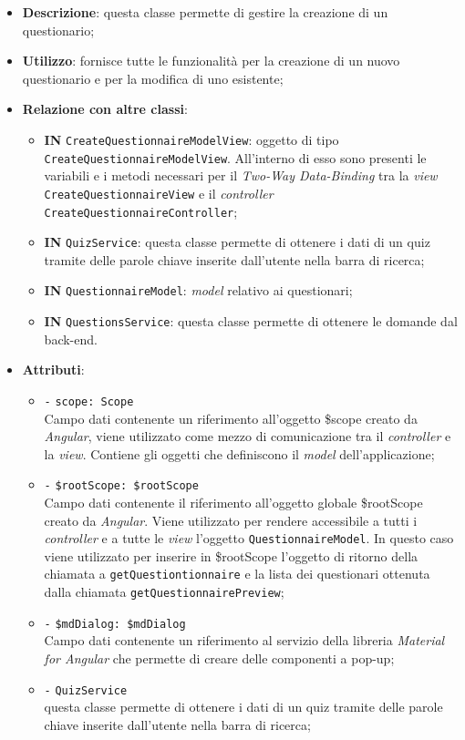 \begin{itemize}
	\item \textbf{Descrizione}: questa classe permette di gestire la creazione di un questionario;
	\item \textbf{Utilizzo}: fornisce tutte le funzionalità per la creazione di un nuovo questionario e per la modifica di uno esistente;
	\item \textbf{Relazione con altre classi}:
	\begin{itemize}
		\item \textbf{IN} \texttt{CreateQuestionnaireModelView}: oggetto di tipo \texttt{CreateQuestionnaireModelView}. All'interno di esso sono presenti le variabili e i metodi necessari per il \textit{Two-Way Data-Binding} tra la \textit{view} \texttt{CreateQuestionnaireView} e il \textit{controller} \\ \texttt{CreateQuestionnaireController}; 
		\item \textbf{IN} \texttt{QuizService}: questa classe permette di ottenere i dati di un quiz tramite delle parole chiave inserite dall'utente nella barra di ricerca;
		\item \textbf{IN} \texttt{QuestionnaireModel}: \textit{model} relativo ai questionari;
		\item \textbf{IN} \texttt{QuestionsService}: questa classe permette di ottenere le domande dal back-end.
	\end{itemize}
	\item \textbf{Attributi}:
	\begin{itemize}
		\item \texttt{-} \texttt{scope: Scope} \\
		Campo dati contenente un riferimento all'oggetto \$scope creato da \textit{Angular}, viene utilizzato come mezzo di comunicazione tra il \textit{controller} e la \textit{view}. Contiene gli oggetti che definiscono il \textit{model} dell'applicazione;
		\item \texttt{-} \texttt{\$rootScope: \$rootScope} \\
		Campo dati contenente il riferimento all'oggetto globale \$rootScope creato da \textit{Angular}. Viene utilizzato per rendere accessibile a tutti i \textit{controller} e a tutte le \textit{view} l'oggetto \texttt{QuestionnaireModel}. In questo caso viene utilizzato per inserire in \$rootScope l'oggetto di ritorno della chiamata a \texttt{getQuestiontionnaire} e la lista dei questionari ottenuta dalla chiamata \texttt{getQuestionnairePreview};
		\item \texttt{-} \texttt{\$mdDialog: \$mdDialog} \\
		Campo dati contenente un riferimento al servizio della libreria \textit{Material for Angular} che permette di creare delle componenti a pop-up;
		\item \texttt{-} \texttt{QuizService} \\ questa classe permette di ottenere i dati di un quiz tramite delle parole chiave inserite dall'utente nella barra di ricerca;


\end{itemize}
\end{itemize}

